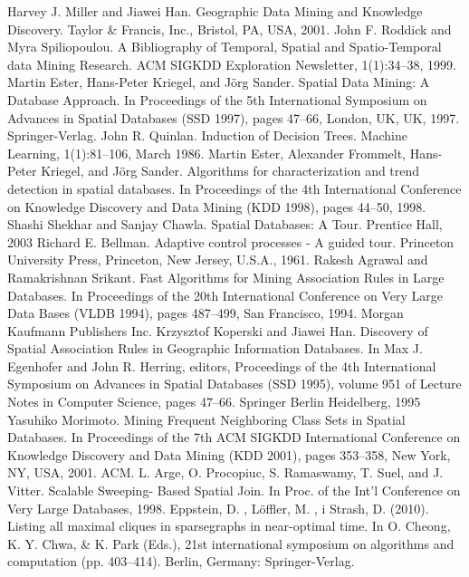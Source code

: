 \documentclass[12pt]{article}
\begin{document}
\begin{thebibliography}{}
 Harvey J. Miller and Jiawei Han. Geographic Data Mining and Knowledge Discovery. Taylor \& Francis, Inc., Bristol, PA, USA, 2001.
John F. Roddick and Myra Spiliopoulou. A Bibliography of Temporal, Spatial and Spatio-Temporal data Mining Research. ACM SIGKDD Exploration Newsletter, 1(1):34–38, 1999.
Martin Ester, Hans-Peter Kriegel, and Jörg Sander. Spatial Data Mining: A Database Approach. In Proceedings of the 5th International Symposium on Advances in Spatial Databases (SSD 1997), pages 47–66, London, UK, UK, 1997. Springer-Verlag.
 John R. Quinlan. Induction of Decision Trees. Machine Learning, 1(1):81–106, March 1986.
Martin Ester, Alexander Frommelt, Hans-Peter Kriegel, and Jörg Sander. Algorithms for characterization and trend detection in spatial databases. In Proceedings of the 4th International Conference on Knowledge Discovery and Data Mining (KDD 1998), pages 44–50, 1998.
Shashi Shekhar and Sanjay Chawla. Spatial Databases: A Tour. Prentice Hall, 2003
 Richard E. Bellman. Adaptive control processes - A guided tour. Princeton University Press, Princeton, New Jersey, U.S.A., 1961.
 Rakesh Agrawal and Ramakrishnan Srikant. Fast Algorithms for Mining Association Rules in Large Databases. In Proceedings of the 20th International Conference on Very Large Data Bases (VLDB 1994), pages 487–499, San Francisco, 1994. Morgan Kaufmann Publishers Inc.
 Krzysztof Koperski and Jiawei Han. Discovery of Spatial Association Rules in Geographic Information Databases. In Max J. Egenhofer and John R. Herring, editors, Proceedings of the 4th International Symposium on Advances in Spatial Databases (SSD 1995), volume 951 of Lecture Notes in Computer Science, pages 47–66. Springer Berlin Heidelberg, 1995
Yasuhiko Morimoto. Mining Frequent Neighboring Class Sets in Spatial Databases. In Proceedings of the 7th ACM SIGKDD International Conference on Knowledge Discovery and Data Mining (KDD 2001), pages 353–358, New York, NY, USA, 2001. ACM.
L. Arge, O. Procopiuc, S. Ramaswamy, T. Suel, and J. Vitter. Scalable Sweeping-
Based Spatial Join. In Proc. of the Int’l Conference on Very Large Databases, 1998.
Eppstein, D. , Löffler, M. , i Strash, D. (2010). Listing all maximal cliques in sparsegraphs in near-optimal time. In O. Cheong, K. Y. Chwa, \& K. Park (Eds.), 21st international symposium on algorithms and computation (pp. 403–414). Berlin, Germany: Springer-Verlag.

\end{thebibliography}
\end{document}
